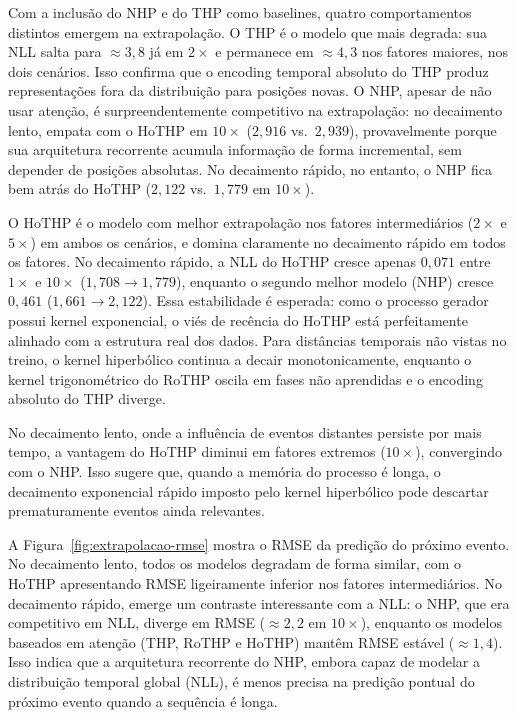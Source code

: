 Com a inclusão do NHP e do THP como baselines, quatro comportamentos distintos emergem na extrapolação. O THP é o modelo que mais degrada: sua NLL salta para $\approx 3{,}8$ já em $2\times$ e permanece em $\approx 4{,}3$ nos fatores maiores, nos dois cenários. Isso confirma que o encoding temporal absoluto do THP produz representações fora da distribuição para posições novas. O NHP, apesar de não usar atenção, é surpreendentemente competitivo na extrapolação: no decaimento lento, empata com o HoTHP em $10\times$ ($2{,}916$ vs.\ $2{,}939$), provavelmente porque sua arquitetura recorrente acumula informação de forma incremental, sem depender de posições absolutas. No decaimento rápido, no entanto, o NHP fica bem atrás do HoTHP ($2{,}122$ vs.\ $1{,}779$ em $10\times$).

O HoTHP é o modelo com melhor extrapolação nos fatores intermediários ($2\times$ e $5\times$) em ambos os cenários, e domina claramente no decaimento rápido em todos os fatores. No decaimento rápido, a NLL do HoTHP cresce apenas $0{,}071$ entre $1\times$ e $10\times$ ($1{,}708 \to 1{,}779$), enquanto o segundo melhor modelo (NHP) cresce $0{,}461$ ($1{,}661 \to 2{,}122$). Essa estabilidade é esperada: como o processo gerador possui kernel exponencial, o viés de recência do HoTHP está perfeitamente alinhado com a estrutura real dos dados. Para distâncias temporais não vistas no treino, o kernel hiperbólico continua a decair monotonicamente, enquanto o kernel trigonométrico do RoTHP oscila em fases não aprendidas e o encoding absoluto do THP diverge.

No decaimento lento, onde a influência de eventos distantes persiste por mais tempo, a vantagem do HoTHP diminui em fatores extremos ($10\times$), convergindo com o NHP. Isso sugere que, quando a memória do processo é longa, o decaimento exponencial rápido imposto pelo kernel hiperbólico pode descartar prematuramente eventos ainda relevantes.

A Figura~\ref{fig:extrapolacao-rmse} mostra o RMSE da predição do próximo evento. No decaimento lento, todos os modelos degradam de forma similar, com o HoTHP apresentando RMSE ligeiramente inferior nos fatores intermediários. No decaimento rápido, emerge um contraste interessante com a NLL: o NHP, que era competitivo em NLL, diverge em RMSE ($\approx 2{,}2$ em $10\times$), enquanto os modelos baseados em atenção (THP, RoTHP e HoTHP) mantêm RMSE estável ($\approx 1{,}4$). Isso indica que a arquitetura recorrente do NHP, embora capaz de modelar a distribuição temporal global (NLL), é menos precisa na predição pontual do próximo evento quando a sequência é longa.

